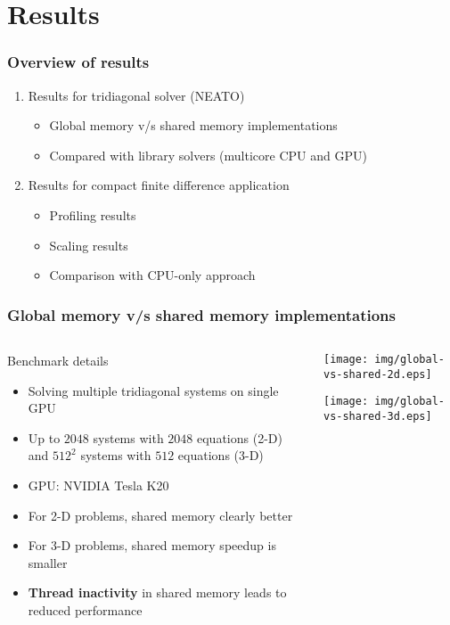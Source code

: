 \section{Results}

\begin{frame}
\frametitle{Overview of results}
\begin{enumerate}
\item Results for tridiagonal solver (NEATO)
\begin{itemize}
    \item Global memory v/s shared memory implementations
    \item Compared with library solvers
        (multicore CPU and GPU)
\end{itemize}
\item Results for compact finite difference application
\begin{itemize}
    \item Profiling results
    \item Scaling results
    \item Comparison with CPU-only approach
\end{itemize}
\end{enumerate}
\end{frame}

\begin{frame}
\frametitle{Global memory v/s shared memory implementations}
\footnotesize
\begin{columns}
\begin{column}{0.5\textwidth}

\begin{block}{Benchmark details}
\begin{itemize}
\item Solving multiple tridiagonal systems on single GPU
\item Up to $2048$ systems with $2048$ equations (2-D)
    and $512^2$ systems with $512$ equations (3-D)
\item GPU: NVIDIA Tesla K20
\end{itemize}
\end{block}

\begin{itemize}
\item For 2-D problems, shared memory clearly better
\item For 3-D problems, shared memory speedup
    is smaller
\item \textbf{Thread inactivity} in shared memory leads
    to reduced performance
\end{itemize}
\end{column}
\begin{column}{0.5\textwidth}
\centering
\texttt{[image: img/global-vs-shared-2d.eps]}

\texttt{[image: img/global-vs-shared-3d.eps]}
\end{column}
\end{columns}
\end{frame}

